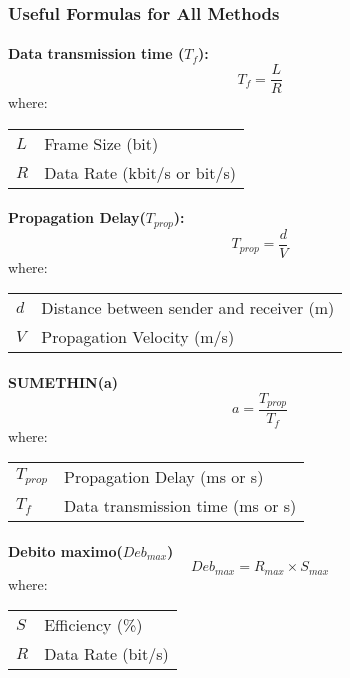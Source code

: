 \documentclass[../resumosRCOM.tex]{subfiles}
\makeatletter
\newenvironment{conditions}
  {\par\vspace{\abovedisplayskip}\noindent\begin{tabular}{>{$}l<{$} @{${}={}$} l}}
  {\end{tabular}\par\vspace{\belowdisplayskip}}
\makeatother
\begin{document}
\subsubsection{Useful Formulas for All Methods}

\paragraph{}
\textbf{Data transmission time ($T_f$):}
\begin{equation}
    {T_f}=\frac{L}{R}
\end{equation}
where:
\begin{conditions}
   L     &   Frame Size (bit) \\
   R &  Data Rate (kbit/s or bit/s)
\end{conditions}

\paragraph{}
\textbf{Propagation Delay($T_{prop}$):}
\begin{equation}
    {T_{prop}}=\frac{d}{V}
\end{equation}
where:
\begin{conditions}
   d     &   Distance between sender and receiver (m) \\
   V &  Propagation Velocity (m/s)
\end{conditions}

\paragraph{}
\textbf{SUMETHIN(a)}
\begin{equation}
    {a}=\frac{T_{prop}}{T_f}
\end{equation}
where:
\begin{conditions}
    T_{prop}    &  Propagation Delay (ms or s) \\
   T_f     &  Data transmission time (ms or s)
\end{conditions}

\paragraph{}
\textbf{Debito maximo($Deb_{max}$)}
\begin{equation}
    {Deb_{max}}={R_{max}}\times{S_{max}}
\end{equation}
where:
\begin{conditions}
   S & Efficiency (\%) \\
   R & Data Rate (bit/s)
\end{conditions}
\end{document}
